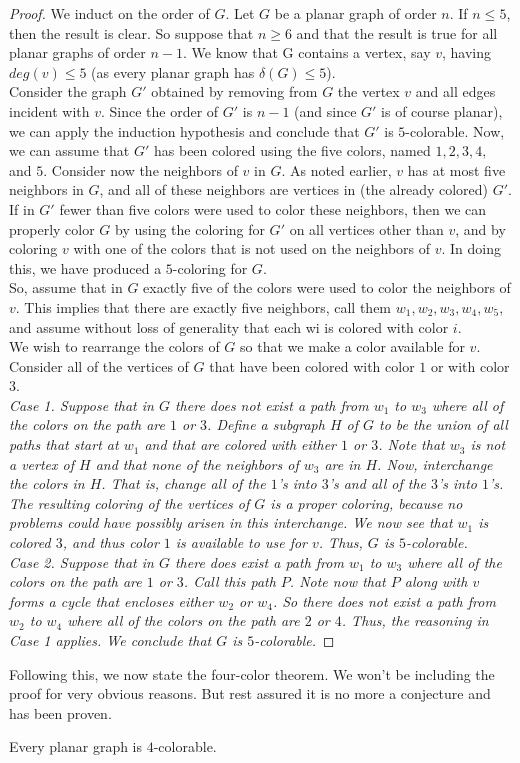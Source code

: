 \documentclass[../basic_graph_theory.tex]{subfiles}
\begin{document}
\begin{proof}
    We induct on the order of $G$. Let $G$ be a planar graph of order $n$. If $n \le 5$, then the result is clear. So suppose that $n \ge 6$ and that the result is true for all planar graphs of order $n - 1$. We know that G contains a vertex, say $v$, having $deg(v) \le 5$ (as every planar graph has $\delta(G) \le 5$).\\
    Consider the graph $G'$ obtained by removing from $G$ the vertex $v$ and all edges incident with $v$. Since the order of $G'$ is $n - 1$ (and since $G'$ is of course planar), we can apply the induction hypothesis and conclude that $G'$ is $5$-colorable. Now, we can assume that $G'$ has been colored using the five colors, named $1,2,3,4,$ and $5$. Consider now the neighbors of $v$ in $G$. As noted earlier, $v$ has at most five neighbors in $G$, and all of these neighbors are vertices in (the already colored) $G'$.\\
    If in $G'$ fewer than five colors were used to color these neighbors, then we can properly color $G$ by using the coloring for $G'$ on all vertices other than $v$, and by coloring $v$ with one of the colors that is not used on the neighbors of $v$. In doing this, we have produced a $5$-coloring for $G$.\\
    So, assume that in $G$ exactly five of the colors were used to color the neighbors of $v$. This implies that there are exactly five neighbors, call them $w_1, w_2, w_3, w_4, w_5,$ and assume without loss of generality that each wi is colored with color $i$.\\
    We wish to rearrange the colors of $G$ so that we make a color available for $v$. Consider all of the vertices of $G$ that have been colored with color $1$ or with color $3$.\\
    \em{Case 1.} Suppose that in $G$ there does not exist a path from $w_1$ to $w_3$ where all of the colors on the path are $1$ or $3$. Define a subgraph $H$ of $G$ to be the union of all paths that start at $w_1$ and that are colored with either $1$ or $3$. Note that $w_3$ is not a vertex of $H$ and that none of the neighbors of $w_3$ are in $H$. Now, interchange the colors in $H$. That is, change all of the $1$'s into $3$'s and all of the $3$'s into $1$'s. The resulting coloring of the vertices of $G$ is a proper coloring, because no problems could have possibly arisen in this interchange. We now see that $w_1$ is colored $3$, and thus color $1$ is available to use for $v$. Thus, $G$ is $5$-colorable.\\
    \em{Case 2.} Suppose that in $G$ there does exist a path from $w_1$ to $w_3$ where all of the colors on the path are $1$ or $3$. Call this path $P$. Note now that $P$ along with $v$ forms a cycle that encloses either $w_2$ or $w_4$. So there does not exist a path from $w_2$ to $w_4$ where all of the colors on the path are $2$ or $4$. Thus, the reasoning in \em{Case 1} applies. We conclude that $G$ is $5$-colorable.
\end{proof}

Following this, we now state the four-color theorem. We won't be including the proof for very obvious reasons. But rest assured it is no more a conjecture and has been proven.
\begin{thm}
    Every planar graph is $4$-colorable.
\end{thm}
\end{document}
